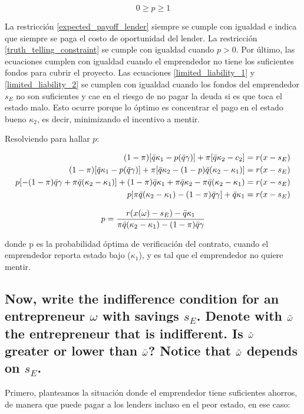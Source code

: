 \documentclass[12pt]{article}
\begin{document}
\begin{equation}
\label{limited_liability_2}
    0 \geq p \geq 1    
\end{equation}

La restricción \eqref{expected_payoff_lender} siempre se cumple con igualdad e indica que siempre se paga el costo de oportunidad del lender. La restricción \eqref{truth_telling_constraint} se cumple con igualdad cuando $p>0$. Por último, las ecuaciones cumplen con igualdad cuando el emprendedor no tiene los suficientes fondos para cubrir el proyecto. Las ecuaciones \eqref{limited_liability_1} y \eqref{limited_liability_2} se cumplen con igualdad cuando los fondos del emprendedor $s_E$ no son suficientes y cae en el riesgo de no pagar la deuda si es que toca el estado malo. Esto ocurre porque lo óptimo es concentrar el pago en el estado bueno $\kappa_2$, es decir, minimizando el incentivo a mentir.

Resolviendo para hallar $p$:

\begin{align*}
        (1- \pi)[\Bar{q}\kappa_1 - p(\Bar{q}\gamma)] + \pi[\Bar{q}\kappa_2-c_2] &= r(x-s_E) \\
        (1- \pi)[\Bar{q}\kappa_1 - p(\Bar{q}\gamma)] + \pi[\Bar{q}\kappa_2-(1-p)\Bar{q}(\kappa_2 - \kappa_1)] &= r(x-s_E) \\
        p[-(1-\pi)\Bar{q}\gamma + \pi\Bar{q}(\kappa_2 - \kappa_1)] + (1-\pi)\Bar{q}\kappa_1 + \pi\Bar{q}\kappa_2 - \pi\Bar{q}(\kappa_2-\kappa_1) &= r(x-s_E) \\
        p[\pi\Bar{q}(\kappa_2 - \kappa_1)-(1-\pi)\Bar{q}\gamma] + \Bar{q}\kappa_1 &= r(x-s_E)
\end{align*}

\[
    p = \frac{r(x(\omega)-s_E)-\Bar{q}\kappa_1}{\pi\Bar{q}(\kappa_2 - \kappa_1)-(1-\pi)\Bar{q}\gamma}
\]

donde p es la probabilidad óptima de verificación del contrato, cuando el emprendedor reporta estado bajo ($\kappa_1$), y es tal que el emprendedor no quiere mentir.

\subsection{Now, write the indifference condition for an entrepreneur $\omega$ with savings
$s_E$. Denote with $\Tilde{\omega}$ the entrepreneur that is indifferent. Is $\Tilde{\omega}$ greater or
lower than $\Bar{\omega}$? Notice that $\Tilde{\omega}$ depends on $s_E$.}

Primero, planteamos la situación donde el emprendedor tiene suficientes ahorros, de manera que puede pagar a los lenders incluso en el peor estado, en ese caso:
\end{document}
